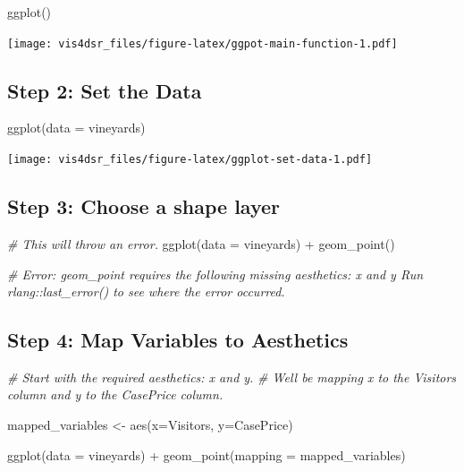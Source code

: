 \documentclass[
]{krantz}
\makeatletter
\newenvironment{Shaded}{\begin{snugshade}}{\end{snugshade}}
\newcommand{\AttributeTok}[1]{\textcolor[rgb]{0.61,0.61,0.61}{#1}}
\newcommand{\CommentTok}[1]{\textcolor[rgb]{0.37,0.37,0.37}{\textit{#1}}}
\newcommand{\FunctionTok}[1]{\textcolor[rgb]{0,0,0}{#1}}
\newcommand{\NormalTok}[1]{#1}
\newcommand{\OtherTok}[1]{\textcolor[rgb]{0.37,0.37,0.37}{#1}}
\newcommand{\SpecialCharTok}[1]{\textcolor[rgb]{0,0,0}{#1}}
\newenvironment{kframe}{%
\medskip{}
\setlength{\fboxsep}{.8em}
 \def\at@end@of@kframe{}%
 \ifinner\ifhmode%
  \def\at@end@of@kframe{\end{minipage}}%
  \begin{minipage}{\columnwidth}%
 \fi\fi%
 \def\FrameCommand##1{\hskip\@totalleftmargin \hskip-\fboxsep
 \colorbox{shadecolor}{##1}\hskip-\fboxsep
     \hskip-\linewidth \hskip-\@totalleftmargin \hskip\columnwidth}%
 \MakeFramed {\advance\hsize-\width
   \@totalleftmargin\z@ \linewidth\hsize
   \@setminipage}}%
 {\par\unskip\endMakeFramed%
 \at@end@of@kframe}
\renewenvironment{Shaded}{\begin{kframe}}{\end{kframe}}
\makeatother
\begin{document}
\begin{Shaded}
\begin{Highlighting}[]
\FunctionTok{ggplot}\NormalTok{()}
\end{Highlighting}
\end{Shaded}

\texttt{[image: vis4dsr\_files/figure-latex/ggpot-main-function-1.pdf]}

\hypertarget{step-2-set-the-data}{%
\subsection{Step 2: Set the Data}\label{step-2-set-the-data}}

\begin{Shaded}
\begin{Highlighting}[]
\FunctionTok{ggplot}\NormalTok{(}\AttributeTok{data =}\NormalTok{ vineyards)}
\end{Highlighting}
\end{Shaded}

\texttt{[image: vis4dsr\_files/figure-latex/ggplot-set-data-1.pdf]}

\hypertarget{step-3-choose-a-shape-layer}{%
\subsection{Step 3: Choose a shape layer}\label{step-3-choose-a-shape-layer}}

\begin{Shaded}
\begin{Highlighting}[]
\CommentTok{\# This will throw an error.}
\FunctionTok{ggplot}\NormalTok{(}\AttributeTok{data =}\NormalTok{ vineyards) }\SpecialCharTok{+}
  \FunctionTok{geom\_point}\NormalTok{()}

\CommentTok{\# Error: geom\_point requires the following missing aesthetics: x and y Run \textasciigrave{}rlang::last\_error()\textasciigrave{} to see where the error occurred.}
\end{Highlighting}
\end{Shaded}

\hypertarget{step-4-map-variables-to-aesthetics}{%
\subsection{Step 4: Map Variables to Aesthetics}\label{step-4-map-variables-to-aesthetics}}

\begin{Shaded}
\begin{Highlighting}[]
\CommentTok{\# Start with the required aesthetics: x and y.}
\CommentTok{\# We\textquotesingle{}ll be mapping x to the Visitors column and y to the CasePrice column.}

\NormalTok{mapped\_variables }\OtherTok{\textless{}{-}} \FunctionTok{aes}\NormalTok{(}\AttributeTok{x=}\NormalTok{Visitors, }\AttributeTok{y=}\NormalTok{CasePrice)}

\FunctionTok{ggplot}\NormalTok{(}\AttributeTok{data =}\NormalTok{ vineyards) }\SpecialCharTok{+}
  \FunctionTok{geom\_point}\NormalTok{(}\AttributeTok{mapping =}\NormalTok{ mapped\_variables)}
\end{Highlighting}
\end{Shaded}
\end{document}
